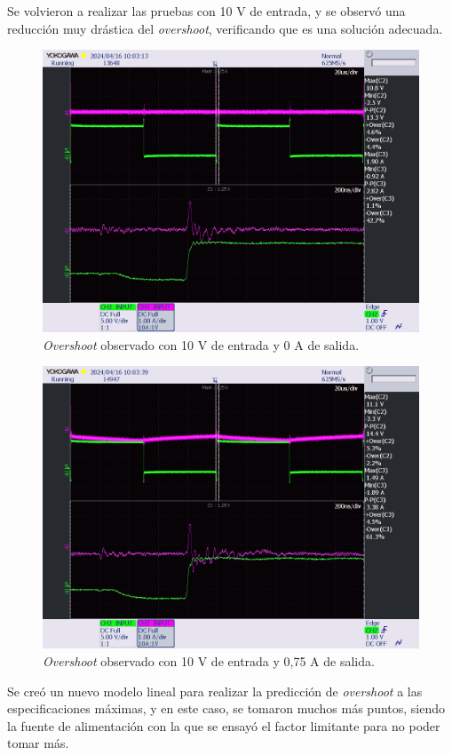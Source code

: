 Se volvieron a realizar las pruebas con 10 V de entrada, y se observó una reducción muy drástica del \textit{overshoot}, verificando que es una solución adecuada.

\begin{figure}[H]
	\centering
	\includegraphics[width=0.7\linewidth]{fig/overshootFinal1}
	\caption{\textit{Overshoot} observado con 10 V de entrada y 0 A de salida.}
\end{figure}

\begin{figure}[H]
	\centering
	\includegraphics[width=0.7\linewidth]{fig/overshootFinal2}
	\caption{\textit{Overshoot} observado con 10 V de entrada y 0,75 A de salida.}
\end{figure}

Se creó un nuevo modelo lineal para realizar la predicción de \textit{overshoot} a las especificaciones máximas, y en este caso, se tomaron muchos más puntos, siendo la fuente de alimentación con la que se ensayó el factor limitante para no poder tomar más.

